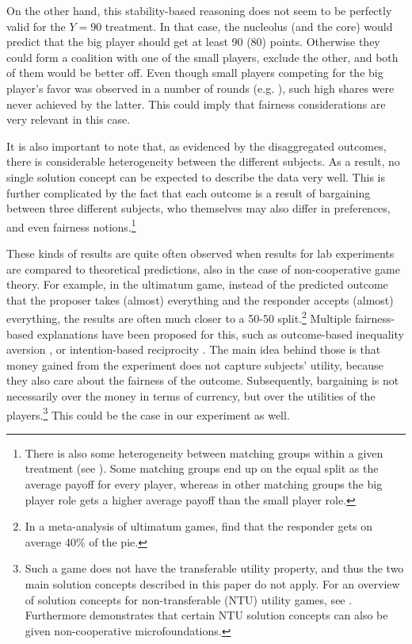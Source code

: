 On the other hand, this stability-based reasoning does not seem to be perfectly valid for the $Y=90$ treatment. In that case, the nucleolus (and the core) would predict that the big player should get at least 90 (80) points. Otherwise they could form a coalition with one of the small players, exclude the other, and both of them would be better off. Even though small players competing for the big player's favor was observed in a number of rounds (e.g. ), such high shares were never achieved by the latter. This could imply that fairness considerations are very relevant in this case.

It is also important to note that, as evidenced by the disaggregated outcomes, there is considerable heterogeneity between the different subjects. As a result, no single solution concept can be expected to describe the data very well. This is further complicated by the fact that each  outcome is a result of bargaining between three different subjects, who themselves may also differ in preferences, and even fairness notions.\footnote{There is also some heterogeneity between matching groups within a given treatment (see ). Some matching groups end up on the equal split as the average payoff for every player, whereas in other matching groups the big player role gets a higher average payoff than the small player role.}

These kinds of results are quite often observed when results for lab experiments are compared to theoretical predictions, also in the case of non-cooperative game theory. For example, in the ultimatum game, instead of the predicted outcome that the proposer takes (almost) everything and the responder accepts (almost) everything, the results are often much closer to a 50-50 split.\footnote{In a meta-analysis of ultimatum games, \textcite{oosterbeek2004cultural} find that the responder gets on average 40\% of the pie.} Multiple fairness-based explanations have been proposed for this, such as outcome-based inequality aversion \parencite[e.g.][]{fehr1999theory,bolton2000erc}, or intention-based reciprocity \parencite[e.g.][]{rabin1993incorporating}. The main idea behind those is that money gained from the experiment does not capture subjects' utility, because they also care about the fairness of the outcome. Subsequently, bargaining is not necessarily over the money in terms of currency, but over the utilities of the players.\footnote{Such a game does not have the transferable utility property, and thus the two main solution concepts described in this paper do not apply. For an overview of solution concepts for non-transferable (NTU) utility games, see \textcite{mclean2002values}. Furthermore \textcite{hart1996bargaining} demonstrates that certain NTU solution concepts can also be given non-cooperative microfoundations.} This could be the case in our experiment as well.


